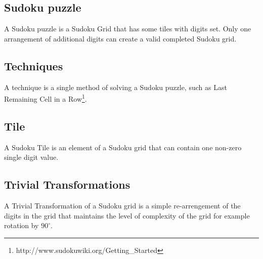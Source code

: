 \documentclass[fleqn]{article}
\begin{document}
\subsection*{Sudoku puzzle}
A Sudoku puzzle is a Sudoku Grid that has some tiles with digits set. Only one arrangement of additional digits can create a valid completed Sudoku grid.
\subsection*{Techniques}
A technique is a single method of solving a Sudoku puzzle, such as Last Remaining Cell in a Row\footnote{http://www.sudokuwiki.org/Getting\_Started}.
\subsection*{Tile}
A Sudoku Tile is an element of a Sudoku grid that can contain one non-zero single digit value.
\subsection*{Trivial Transformations}
A Trivial Transformation of a Sudoku grid is a simple re-arrengement of the digits in the grid that maintains the level of complexity of the grid for example rotation by $90^\circ$.
\end{document}
